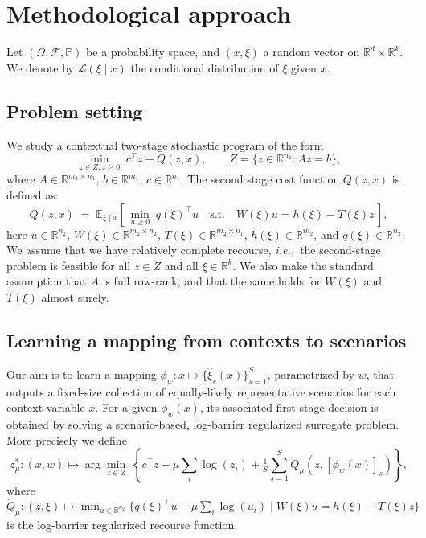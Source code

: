 \documentclass{article}
\begin{document}
\section{Methodological approach}
\label{sec:method}
Let $(\Omega, \mathcal{F}, \mathbb{P})$ be a probability space, and $(x,\xi)$ a
random vector on $\mathbb{R}^d \times \mathbb{R}^k$.
We denote by $\mathcal{L}(\xi\mid x)$ the conditional distribution of $\xi$
given $x$.

\subsection{Problem setting}
We study a contextual two-stage stochastic program of the form
\begin{equation}
    \label{pb:2stage}
    \min_{z \in Z, z \geq 0}\; c^\top z + Q(z,x),
    \qquad
    Z = \{z \in \mathbb{R}^{n_1} : Az=b\},
\end{equation}
where $A \in \mathbb{R}^{m_1\times n_1}$, $b \in \mathbb{R}^{m_1}$, $c \in \mathbb{R}^{n_1}$.
The second stage cost function $Q(z,x)$ is defined as:
\begin{equation}
    \label{eq:recourse}
    Q(z,x) \;=\; \mathbb{E}_{\xi\mid x}\!
    \left[\,\min_{u\ge 0} \; q(\xi)^\top u \quad \text{s.t.}\quad W(\xi)u = h(\xi) - T(\xi)z \,\right],
\end{equation}
here $u \in \mathbb{R}^{n_2}$, $W(\xi) \in \mathbb{R}^{m_2\times n_2}$, $T(\xi)
    \in \mathbb{R}^{m_2\times n_1}$, $h(\xi) \in \mathbb{R}^{m_2}$, and $q(\xi) \in
    \mathbb{R}^{n_2}$.
We assume that we have relatively complete recourse, \emph{i.e.,~}the
second-stage problem is feasible for all $z \in Z$ and all $\xi \in
    \mathbb{R}^k$.
We also make the standard assumption that $A$ is full row-rank, and that the
same holds for $W(\xi)$ and $T(\xi)$ almost surely.

\subsection{Learning a mapping from contexts to scenarios}
Our aim is to learn a mapping $\phi_w:x \mapsto \{\hat{\xi}_s(x)\}_{s=1}^S$,
parametrized by $w$, that outputs a fixed-size collection of equally-likely representative
scenarios for each context variable $x$.
For a given $\phi_w(x)$, its associated first-stage decision is obtained by
solving a scenario-based, log-barrier regularized surrogate problem.
More precisely we define
\begin{equation}
    z^*_{\mu} : (x,w) \mapsto \arg\min_{z \in Z} \; \left\{c^\top z - \mu \sum_i \log(z_i) +  \tfrac{1}{S}\sum_{s=1}^S \dot Q_\mu(z,[\phi_w(x)]_s)\right\},
\end{equation}
where $\dot Q_\mu:(z,\xi)\mapsto \min_{u \in \mathbb{R}^{n_2}} \{ q(\xi)^\top u 
-\mu\sum_{i} \log(u_i)  \;|\; W(\xi)u = h(\xi) - T(\xi)z \}$ is the log-barrier regularized recourse function. 
\end{document}
